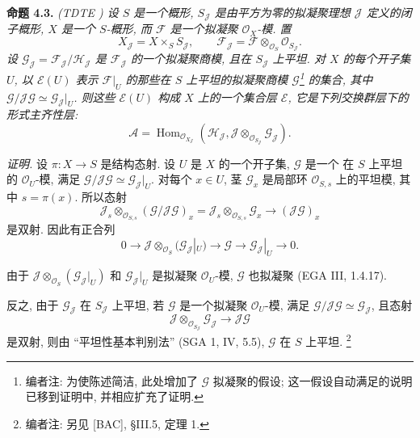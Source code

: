 \medskip
\noindent{}\textbf{命题 4.3.}
\textit{(TDTE )
设 \(S\) 是一个概形,
\(S_{\mathscr J}\) 是由平方为零的拟凝聚理想 \(\mathscr J\) 定义的闭子概形,
\(X\) 是一个 \(S\)-概形, 而 \(\mathscr F\) 是一个拟凝聚
\(\mathscr O_X\)-模. 置
\[
 X_{\mathscr J}=X\times_S S_{\mathscr J},\qquad
 \mathscr F_{\mathscr J}
 =\mathscr F\otimes_{\mathscr O_S}\mathscr O_{S_{\mathscr J}}.
\]
设 \(\mathscr G_{\mathscr J}=\mathscr F_{\mathscr J}/\mathscr H_{\mathscr J}\)
是 \(\mathscr F_{\mathscr J}\) 的一个拟凝聚商模, 且在
\(S_{\mathscr J}\) 上平坦.
对 \(X\) 的每个开子集 \(U\), 以 \(\mathcal E(U)\) 表示
\(\mathscr F|_U\) 的那些在 \(S\) 上平坦的拟凝聚商模
\(\mathscr G\)\footnote{编者注: 为使陈述简洁,
此处增加了 \(\mathscr G\) 拟凝聚的假设;
这一假设自动满足的说明已移到证明中, 并相应扩充了证明.}
的集合, 其中 \(\mathscr G/\mathscr J\mathscr G\simeq
\mathscr G_{\mathscr J}|_U\).
则这些 \(\mathcal E(U)\) 构成 \(X\) 上的一个集合层 \(\mathcal E\),
它是下列交换群层下的形式主齐性层:
\[
 \mathscr A=
 \operatorname{Hom}_{\mathscr O_{X_{\mathscr J}}}
  \left(
   \mathscr H_{\mathscr J},
   \mathscr J\otimes_{\mathscr O_{S_{\mathscr J}}}
   \mathscr G_{\mathscr J}
  \right).
\]}

\noindent\textit{证明.}
设 \(\pi:X\to S\) 是结构态射.
设 \(U\) 是 \(X\) 的一个开子集, \(\mathscr G\) 是一个
在 \(S\) 上平坦的 \(\mathscr O_U\)-模, 满足
\(\mathscr G/\mathscr J\mathscr G\simeq
\mathscr G_{\mathscr J}|_U\).
对每个 \(x\in U\), 茎 \(\mathscr G_x\) 是局部环
\(\mathscr O_{S,s}\) 上的平坦模, 其中 \(s=\pi(x)\).
所以态射
\[
 \mathscr J_s\otimes_{\mathscr O_{S,s}}
  (\mathscr G/\mathscr J\mathscr G)_x
 =\mathscr J_s\otimes_{\mathscr O_{S,s}}\mathscr G_x
 \longrightarrow(\mathscr J\mathscr G)_x
\]
是双射. 因此有正合列
\[
 0\longrightarrow
 \mathscr J\otimes_{\mathscr O_S}(\mathscr G_{\mathscr J}|_U)
 \longrightarrow\mathscr G\longrightarrow
 \mathscr G_{\mathscr J}|_U\longrightarrow0.
\]

由于 \(\mathscr J\otimes_{\mathscr O_S}(\mathscr G_{\mathscr J}|_U)\)
和 \(\mathscr G_{\mathscr J}|_U\) 是拟凝聚 \(\mathscr O_U\)-模,
\(\mathscr G\) 也拟凝聚 (EGA III, 1.4.17).

反之, 由于 \(\mathscr G_{\mathscr J}\) 在 \(S_{\mathscr J}\) 上平坦,
若 \(\mathscr G\) 是一个拟凝聚 \(\mathscr O_U\)-模, 满足
\(\mathscr G/\mathscr J\mathscr G\simeq\mathscr G_{\mathscr J}\),
且态射
\[
 \mathscr J\otimes_{\mathscr O_{S_{\mathscr J}}}
 \mathscr G_{\mathscr J}\longrightarrow\mathscr J\mathscr G
\]
是双射, 则由 ``平坦性基本判别法'' (SGA 1, IV, 5.5),
\(\mathscr G\) 在 \(S\) 上平坦.
\footnote{编者注: 另见 [BAC], \S III.5, 定理 1.}

